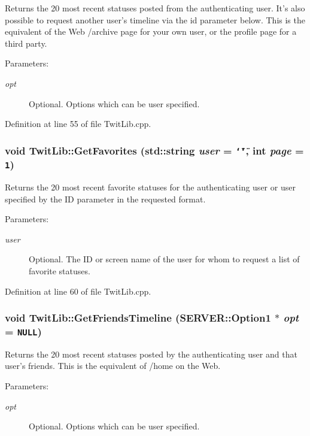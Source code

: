 Returns the 20 most recent statuses posted from the authenticating user. It's also possible to request another user's timeline via the id parameter below. This is the equivalent of the Web /archive page for your own user, or the profile page for a third party. \begin{Desc}
\item[Parameters:]
\begin{description}
\item[{\em opt}]Optional. Options which can be user specified. \end{description}
\end{Desc}


Definition at line 55 of file TwitLib.cpp.\hypertarget{classTwitLib_497063a88015c8c819a3b4195b2441d7}{
\subsubsection{\setlength{\rightskip}{0pt plus 5cm}void TwitLib::GetFavorites (std::string {\em user} = {\tt \char`\"{}\char`\"{}}, \/  int {\em page} = {\tt 1})}}
\label{classTwitLib_497063a88015c8c819a3b4195b2441d7}


Returns the 20 most recent favorite statuses for the authenticating user or user specified by the ID parameter in the requested format. \begin{Desc}
\item[Parameters:]
\begin{description}
\item[{\em user}]Optional. The ID or screen name of the user for whom to request a list of favorite statuses. \end{description}
\end{Desc}


Definition at line 60 of file TwitLib.cpp.\hypertarget{classTwitLib_481b7acf927c6421b1af4004fad544cc}{
\subsubsection{\setlength{\rightskip}{0pt plus 5cm}void TwitLib::GetFriendsTimeline ({\bf SERVER::Option1} $\ast$ {\em opt} = {\tt NULL})}}
\label{classTwitLib_481b7acf927c6421b1af4004fad544cc}


Returns the 20 most recent statuses posted by the authenticating user and that user's friends. This is the equivalent of /home on the Web. \begin{Desc}
\item[Parameters:]
\begin{description}
\item[{\em opt}]Optional. Options which can be user specified. \end{description}
\end{Desc}


